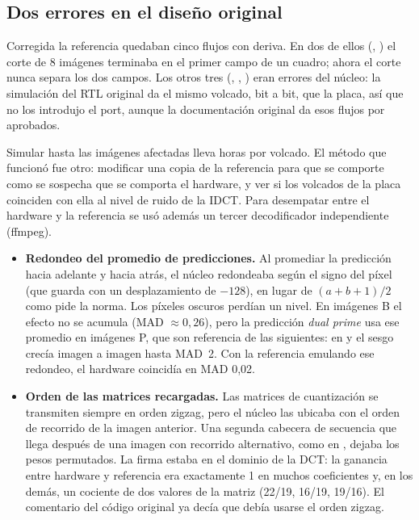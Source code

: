 \subsection{Dos errores en el diseño original}
\label{sec:conformidad-upstream}

Corregida la referencia quedaban cinco flujos con deriva. En dos de ellos
(, ) el corte de 8 imágenes terminaba en
el primer campo de un cuadro; ahora el corte nunca separa los dos campos.
Los otros tres (, , ) eran
errores del núcleo: la simulación del RTL original da el mismo volcado, bit
a bit, que la placa, así que no los introdujo el port, aunque la
documentación original da esos flujos por aprobados.

Simular hasta las imágenes afectadas lleva horas por volcado. El método que
funcionó fue otro: modificar una copia de la referencia para que se
comporte como se sospecha que se comporta el hardware, y ver si los
volcados de la placa coinciden con ella al nivel de ruido de la IDCT. Para
desempatar entre el hardware y la referencia se usó además un tercer
decodificador independiente (ffmpeg).

\begin{itemize}
  \item \textbf{Redondeo del promedio de predicciones.} Al promediar la
    predicción hacia adelante y hacia atrás, el núcleo redondeaba según el
    signo del píxel (que guarda con un desplazamiento de $-128$), en lugar
    de $(a+b+1)/2$ como pide la norma. Los píxeles oscuros perdían un nivel.
    En imágenes B el efecto no se acumula (MAD $\approx 0{,}26$), pero la
    predicción \emph{dual prime} usa ese promedio en imágenes P, que son
    referencia de las siguientes: en  y  el
    sesgo crecía imagen a imagen hasta MAD~2. Con la referencia emulando
    ese redondeo, el hardware coincidía en MAD 0,02.
  \item \textbf{Orden de las matrices recargadas.} Las matrices de
    cuantización se transmiten siempre en orden zigzag, pero el núcleo las
    ubicaba con el orden de recorrido de la imagen anterior. Una segunda
    cabecera de secuencia que llega después de una imagen con recorrido
    alternativo, como en , dejaba los pesos permutados. La
    firma estaba en el dominio de la DCT: la ganancia entre hardware y
    referencia era exactamente 1 en muchos coeficientes y, en los demás, un
    cociente de dos valores de la matriz (22/19, 16/19, 19/16). El
    comentario del código original ya decía que debía usarse el orden zigzag.
\end{itemize}

